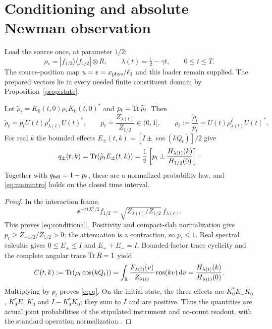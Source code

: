 \section{Conditioning and absolute Newman observation}\label{sec:observation}

Load the source once, at parameter $1/2$:
\begin{equation}\label{eq:initial}
 \rho_*=|f_{1/2}\rangle\langle f_{1/2}|\otimes R,\qquad
 \lambda(t)=\tfrac12-\gamma t,\qquad 0\le t\le T.
\end{equation}
The source-position map $u=v=x_{\rm phys}/\ell_0$ and this loader remain
supplied. The prepared vectors lie in every needed finite constituent
domain by Proposition~\ref{prop:state}.

\begin{theorem}\label{thm:readout}
Let $\widetilde\rho_t=K_0(t,0)\rho_*K_0(t,0)^*$ and
$p_t=\operatorname{Tr}\widetilde\rho_t$. Then
\begin{equation}\label{eq:conditional}
 \widetilde\rho_t=p_tU(t)\rho^I_{\lambda(t)}U(t)^*,\qquad
 p_t=\frac{Z_{\lambda(t)}}{Z_{1/2}}\in(0,1],\qquad
 \rho_t:=\frac{\widetilde\rho_t}{p_t}=U(t)\rho^I_{\lambda(t)}U(t)^*.
\end{equation}
For real $k$ the bounded effects
$E_\pm(t,k)=[I\pm\cos(kQ_t)]/2$ give
\begin{equation}\label{eq:q}
 q_\pm(t,k)=\operatorname{Tr}(\widetilde\rho_tE_\pm(t,k))
 =\frac12\left[p_t\pm\frac{H_{\lambda(t)}(k)}{H_{1/2}(0)}\right].
\end{equation}
Together with $q_{\rm fail}=1-p_t$, these are a normalized probability
law, and \eqref{eq:mainintro} holds on the closed time interval.
\end{theorem}
\begin{proof}
In the interaction frame,
\[
 \ee^{-\gamma tX^2/2}f_{1/2}
 =\sqrt{Z_{\lambda(t)}/Z_{1/2}}\,f_{\lambda(t)}.
\]
This proves \eqref{eq:conditional}. Positivity and compact-slab normalization
give $p_t\ge Z_{-1/2}/Z_{1/2}>0$; the attenuation is a contraction, so
$p_t\le1$. Real spectral calculus gives $0\le E_\pm\le I$ and
$E_++E_-=I$. Bounded-factor trace cyclicity and the complete angular
trace $\operatorname{Tr} R=1$ yield
\begin{equation}\label{eq:cosine}
 C(t,k):=\operatorname{Tr}(\rho_t\cos(kQ_t))
 =\int_\mathbb R\frac{F_{\lambda(t)}(v)}{Z_{\lambda(t)}}\cos(kv)\,\mathrm d v
 =\frac{H_{\lambda(t)}(k)}{H_{\lambda(t)}(0)}.
\end{equation}
Multiplying by $p_t$ proves \eqref{eq:q}. On the initial state, the three
effects are $K_0^*E_+K_0$, $K_0^*E_-K_0$ and $I-K_0^*K_0$; they sum to
$I$ and are positive. Thus the quantities are actual joint probabilities
of the stipulated instrument and no-count readout, with the standard
operation normalization \cite[Section III, (17)--(19)]{JacobsSteck2006v1}.
\end{proof}

